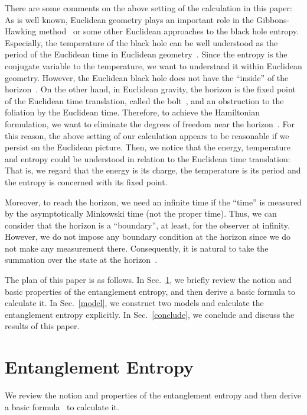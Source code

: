 \documentclass[12pt,epsf]{article}
\begin{document}
There are some comments on the above setting
of the calculation in this paper:
As is well known,
Euclidean geometry plays an important role
in the Gibbons-Hawking method~\cite{GibHaw77,Hawkin79}
or some other Euclidean approaches to the black hole entropy.
Especially,
the temperature of the black hole 
can be well understood as the period of the Euclidean time
in Euclidean geometry~\cite{GibPer,ChrDuf78,TroVan79}.
Since the entropy is the conjugate variable to 
the temperature, we want to understand it
within Euclidean geometry.
However, the Euclidean black hole does not have
the ``inside'' of the horizon~\cite{Hawkin79,Wald84}.
On the other hand,
in Euclidean gravity, the horizon is the fixed point
of the Euclidean time translation,
called the bolt~\cite{GibHaw79},
and an obstruction to the foliation by the Euclidean time.
Therefore, to achieve the Hamiltonian formulation,
we want to eliminate the degrees of freedom near
the horizon~\cite{HawHor96,HawHun99}.
For this reason,
the above setting of our calculation appears to
be reasonable if we persist on the Euclidean picture.
Then, we notice that the energy, temperature and entropy could
be understood in relation to the Euclidean time translation:
That is, we regard that the energy is its charge,
the temperature is its period and
the entropy is concerned with its fixed point.

Moreover, to reach the horizon, we need an infinite time 
if the ``time'' is measured by
the asymptotically Minkowski time (not the proper time).
Thus, we can consider that the horizon is a ``boundary'',
at least, for the observer at infinity.
However, we do not impose any boundary condition at the horizon
since we do not make any measurement there.
Consequently, it is natural to take the summation
over the state at the horizon~\cite{Hawkin76}.

The plan of this paper is as follows.
In Sec.~\ref{formula}, we briefly review
the notion and basic properties of the entanglement entropy,
and then derive a basic formula to calculate it.
In Sec.~\ref{model}, we construct two models and
calculate the entanglement entropy explicitly.
In Sec.~\ref{conclude}, we conclude and discuss
the results of this paper.

\section{Entanglement Entropy}
\label{formula}
We review the notion and properties
of the entanglement entropy
and then derive a basic
formula~\cite{BKLS86} to calculate it.
\end{document}

